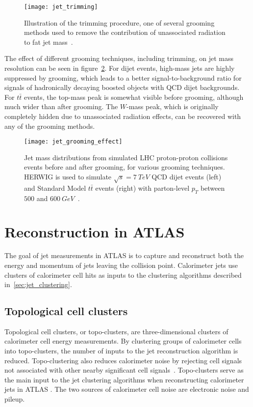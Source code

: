 \begin{figure}[!ht]
    \centering
\texttt{[image: jet\_trimming]}
\caption{Illustration of the trimming procedure, one of several grooming methods used to remove the contribution
of unassociated radiation to fat jet mass~\cite{jet-grooming-slides}.}
\label{fig:jet_trimming}
\end{figure}

The effect of different grooming techniques, including trimming, on jet mass resolution can be seen in figure~\ref{fig:jet_grooming_effect}.
For dijet events, high-mass jets are highly suppressed by grooming, which leads to a better signal-to-background ratio for signals of hadronically decaying boosted objects with QCD dijet backgrounds.
For $t\bar{t}$ events, the top-mass peak is somewhat visible before grooming, although much wider than after grooming.
The $W$-mass peak, which is originally completely hidden due to unassociated radiation effects, can be recovered with any of the grooming methods.

\begin{figure}[!ht]
    \centering
\texttt{[image: jet\_grooming\_effect]}
\caption{Jet mass distributions from simulated LHC proton-proton collisions events before and after grooming, for various grooming techniques.
HERWIG is used to simulate $\sqrt{s}=7~TeV$ QCD dijet events (left) and Standard Model $t\bar{t}$ events (right) with parton-level $p_{T}$ between $500$ and $600~GeV$~\cite{jet-boosted}.}
\label{fig:jet_grooming_effect}
\end{figure}

\section{Reconstruction in ATLAS}\label{sec:jet_reconstruction}
The goal of jet measurements in ATLAS is to capture and reconstruct both the energy and momentum of jets leaving the collision point.
Calorimeter jets use clusters of calorimeter cell hits as inputs to the clustering algorithms described in~\ref{sec:jet_clustering}.

\subsection{Topological cell clusters}\label{subsec:jet_topo_clusters}
Topological cell clusters, or topo-clusters, are three-dimensional clusters of calorimeter cell energy measurements.
By clustering groups of calorimeter cells into topo-clusters, the number of inputs to the jet reconstruction algorithm is reduced.
Topo-clustering also reduces calorimeter noise by rejecting cell signals not associated with other nearby significant cell signals~\cite{jet-topo-cluster}.
Topo-clusters serve as the main input to the jet clustering algorithms when reconstructing calorimeter jets in ATLAS .
The two sources of calorimeter cell noise are electronic noise and pileup.

